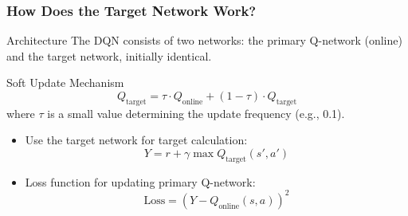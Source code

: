 \documentclass[aspectratio=169]{beamer}
\begin{document}
\begin{frame}[fragile]
    \frametitle{How Does the Target Network Work?}
    \begin{block}{Architecture}
        The DQN consists of two networks: the primary Q-network (online) and the target network, initially identical.
    \end{block}
    
    \begin{block}{Soft Update Mechanism}
        \begin{equation}
        Q_{\text{target}} = \tau \cdot Q_{\text{online}} + (1 - \tau) \cdot Q_{\text{target}}
        \end{equation}
        where $\tau$ is a small value determining the update frequency (e.g., 0.1).
    \end{block}

    \begin{itemize}
        \item Use the target network for target calculation:
        \begin{equation}
        Y = r + \gamma \max Q_{\text{target}}(s', a')
        \end{equation}
        \item Loss function for updating primary Q-network:
        \begin{equation}
        \text{Loss} = \left( Y - Q_{\text{online}}(s, a) \right)^2
        \end{equation}
    \end{itemize}
\end{frame}
\end{document}
